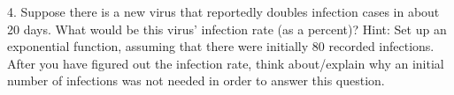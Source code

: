 \documentclass{ximera}
\begin{document}
\begin{exploration}
4.	Suppose there is a new virus that reportedly doubles infection cases in about 20 days.  What would be this virus' infection rate (as a percent)?
Hint: Set up an exponential function, assuming that there were initially 80 recorded infections.  After you have figured out the infection rate, think about/explain why an initial number of infections was not needed in order to answer this question.

\end{exploration}


%
%
%
%
%
%
%
%
\end{document}
